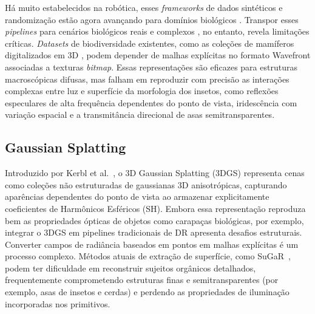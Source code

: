 \documentclass[a4paper,12pt]{article}
\begin{document}
{ Há muito estabelecidos na robótica, esses \emph{frameworks} de dados sintéticos e randomização estão agora avançando para domínios biológicos \cite{margapuri2021classification, aghamohammadi2025blender}. Transpor esses \emph{pipelines} para cenários biológicos reais e complexos \cite{bjerge2023accurate}, no entanto, revela limitações críticas. \emph{Datasets} de biodiversidade existentes, como as coleções de mamíferos digitalizados em 3D \cite{blair2025leveraging}, podem depender de malhas explícitas no formato Wavefront associadas a texturas \emph{bitmap}. Essas representações são eficazes para estruturas macroscópicas difusas, mas falham em reproduzir com precisão as interações complexas entre luz e superfície da morfologia dos insetos, como reflexões especulares de alta frequência dependentes do ponto de vista, iridescência com variação espacial e a transmitância direcional de asas semitransparentes.
 

 \subsection{Gaussian Splatting}
 
 Introduzido por Kerbl et al.~\cite{kerbl20233d}, o 3D Gaussian Splatting (3DGS) representa cenas como coleções não estruturadas de gaussianas 3D anisotrópicas, capturando aparências dependentes do ponto de vista ao armazenar explicitamente coeficientes de Harmônicos Esféricos (SH). Embora essa representação reproduza bem as propriedades ópticas de objetos como carapaças biológicas, por exemplo, integrar o 3DGS em pipelines tradicionais de DR apresenta desafios estruturais. Converter campos de radiância baseados em pontos em malhas explícitas é um processo complexo. Métodos atuais de extração de superfície, como SuGaR~\cite{guedon2024sugar}, podem ter dificuldade em reconstruir sujeitos orgânicos detalhados, frequentemente comprometendo estruturas finas e semitransparentes (por exemplo, asas de insetos e cerdas) e perdendo as propriedades de iluminação incorporadas nos primitivos.

}
\end{document}
